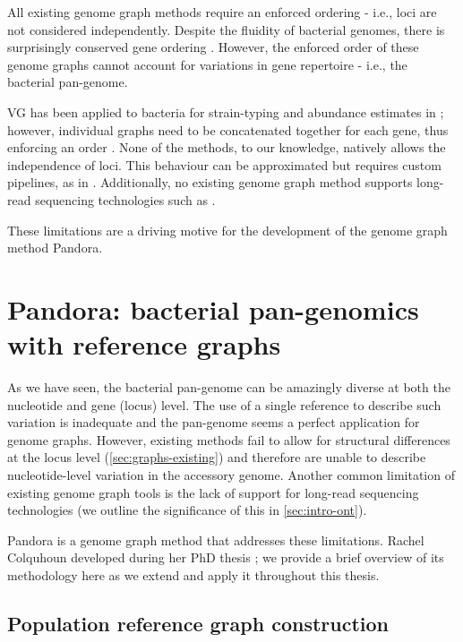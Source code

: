 \noindent
All existing genome graph methods require an enforced ordering - i.e., loci are not considered independently. Despite the fluidity of bacterial genomes, there is surprisingly conserved gene ordering \cite{Tamames2001,Rocha2008}. However, the enforced order of these genome graphs cannot account for variations in gene repertoire - i.e., the bacterial pan-genome. 

VG has been applied to bacteria for strain-typing and abundance estimates in \ecoli{}; however, individual graphs need to be concatenated together for each gene, thus enforcing an order \cite{strainflair2021}. None of the methods, to our knowledge, natively allows the independence of loci. This behaviour can be approximated but requires custom pipelines, as in \cite{strainflair2021}. Additionally, no existing genome graph method supports long-read sequencing technologies such as \ont{}.

These limitations are a driving motive for the development of the genome graph method Pandora.

\section{Pandora: bacterial pan-genomics with reference graphs}
\label{sec:pandora-intro}

As we have seen, the bacterial pan-genome can be amazingly diverse at both the nucleotide and gene (locus) level. The use of a single reference to describe such variation is inadequate and the pan-genome seems a perfect application for genome graphs. However, existing methods fail to allow for structural differences at the locus level (\autoref{sec:graphs-existing}) and therefore are unable to describe nucleotide-level variation in the accessory genome. Another common limitation of existing genome graph tools is the lack of support for long-read sequencing technologies (we outline the significance of this in \autoref{sec:intro-ont}).

Pandora is a genome graph method that addresses these limitations. Rachel Colquhoun developed \pandora{} during her PhD thesis \cite{rachelthesis}; we provide a brief overview of its methodology here as we extend and apply it throughout this thesis.

\subsection{Population reference graph construction}
\label{sec:make_prg}

